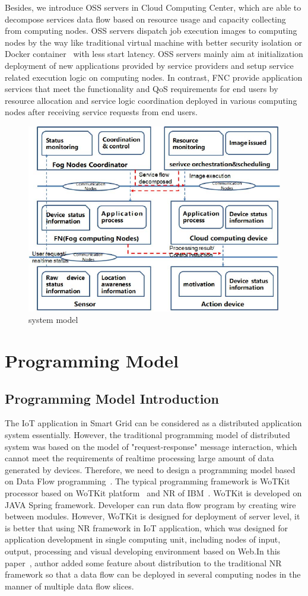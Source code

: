 \documentclass[conference]{IEEEtran}
\begin{document}
Besides, we introduce OSS servers in Cloud Computing Center, which are able to decompose services data flow based on resource usage and capacity collecting from computing nodes. OSS servers dispatch job execution images to computing nodes by the way like traditional virtual machine with better security isolation or Docker container~\cite{Hong2016} with less start latency. OSS servers mainly aim at initialization deployment of new applications provided by service providers and setup service related execution logic on computing nodes. In contrast, FNC provide application services that meet the functionality and QoS requirements for end users by resource allocation and service logic coordination deployed in various computing nodes after receiving service requests from end users.   
\begin{figure}[h]
	\centering\includegraphics[width=3.4 in]{figures/Fig_2_model} 
	\caption{system model}\label{fig:Fig_2_model} %
\end{figure}



\section{Programming Model}
\subsection{Programming Model Introduction}
The IoT application in Smart Grid can be considered as a distributed  application system essentially. However, the traditional programming model of distributed system was based on the model of "request-response" message interaction, which cannot meet the requirements of realtime processing  large amount of data generated by devices. Therefore, we need to design a programming model based on Data Flow programming~\cite{Johnston2004}. The typical programming framework is WoTKit processor based on WoTKit platform~\cite{Blackstock2012} and NR of IBM~\cite{ibm}. WoTKit is developed on JAVA Spring framework. Developer can run data flow program by creating wire between modules. However, WoTKit is designed for deployment of server level, it is better that using NR framework in IoT application, which was designed for application development in single computing unit, including nodes of input, output, processing and visual developing environment based on Web.In this paper~\cite{Giang2015}, author added some feature about distribution to  the traditional NR framework so that a data flow can be deployed in several computing nodes in the manner of multiple data flow slices. 
\end{document}
